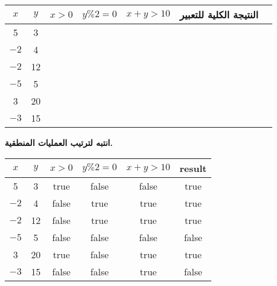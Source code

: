 ﻿\documentclass[12pt]{article}
\begin{document}
\begin{enumerate}[itemsep=3em]
\begin{center}
\begin{tabular}{|c|c|c|c|c|c|c|}
\hline
$x$ & $y$ & $x>0$ & $y \% 2 = 0$ & $x+y>10$ & النتيجة الكلية للتعبير \\
\hline
5  & 3  &  &  &  &  \\
\hline
$-2$ & 4  &  &  &  &  \\
\hline
$-2$ & 12 &  &  &  &  \\
\hline
$-5$ & 5  &  &  &  &  \\
\hline
3  & 20 &  &  &  &  \\
\hline
$-3$ & 15 &  &  &  &  \\
\hline
\end{tabular}
\end{center}
\textbf{انتبه لترتيب العمليات المنطقية.}
\ifwithsols
\begin{boxSolution}
\begin{center}
\begin{tabular}{|c|c|c|c|c|c|}
\hline
\large{$x$} & \large{$y$} & \large{$x>0$} & \large{$y \% 2 = 0$} & \large{$x+y>10$} & \large{\textenglish{result}} \\
\hline
5 & 3 & true & false & false & true \\
\hline
$-2$ & 4 & false & true & true & true \\
\hline
$-2$ & 12 & false & true & true & true \\
\hline
$-5$ & 5 & false & false & false & false \\
\hline
3 & 20 & true & false & true & true \\
\hline
$-3$ & 15 & false & false & true & false \\
\hline
\end{tabular}
\end{center}
\end{boxSolution}
\fi


\end{enumerate}
\end{document}
